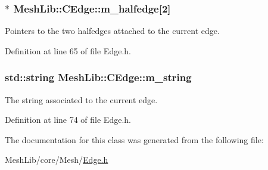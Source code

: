 \subsubsection[{\texorpdfstring{m\+\_\+halfedge}{m_halfedge}}]{$\ast$ Mesh\+Lib\+::\+C\+Edge\+::m\+\_\+halfedge\mbox{[}2\mbox{]}\hspace{0.3cm}{\ttfamily [protected]}}\hypertarget{class_mesh_lib_1_1_c_edge_a1d597f8d90c6c322ffbc5a454e7efb94}{}\label{class_mesh_lib_1_1_c_edge_a1d597f8d90c6c322ffbc5a454e7efb94}
Pointers to the two halfedges attached to the current edge. 

Definition at line 65 of file Edge.\+h.

\subsubsection[{\texorpdfstring{m\+\_\+string}{m_string}}]{\setlength{\rightskip}{0pt plus 5cm}std\+::string Mesh\+Lib\+::\+C\+Edge\+::m\+\_\+string\hspace{0.3cm}{\ttfamily [protected]}}\hypertarget{class_mesh_lib_1_1_c_edge_a810f0a280e3a97d449386cc5cb6cce3b}{}\label{class_mesh_lib_1_1_c_edge_a810f0a280e3a97d449386cc5cb6cce3b}
The string associated to the current edge. 

Definition at line 74 of file Edge.\+h.



The documentation for this class was generated from the following file\+:\begin{DoxyCompactItemize}
\item 
Mesh\+Lib/core/\+Mesh/\hyperlink{_edge_8h}{Edge.\+h}\end{DoxyCompactItemize}
